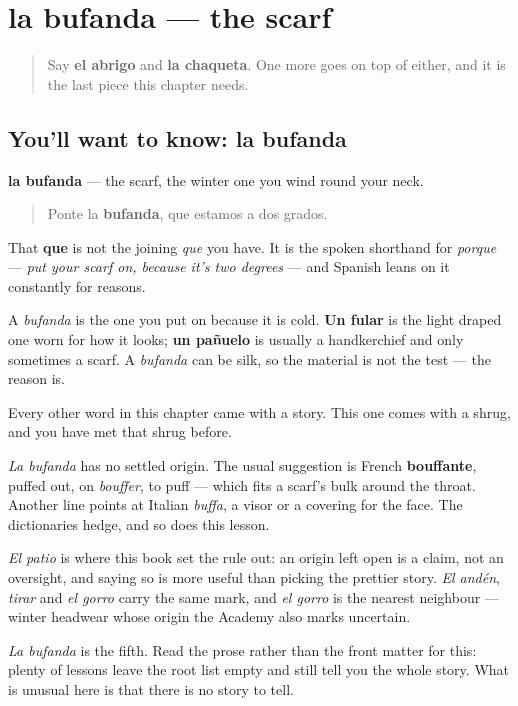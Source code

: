 \section[la bufanda]{la bufanda — the scarf}

\label{lesson:ES-C468-bufanda}



\begin{quote}
Say \textbf{el abrigo} and \textbf{la chaqueta}. One more goes on top of either, and it is the last piece this chapter needs.
\end{quote}

\subsection*{You'll want to know: la bufanda}
\textbf{la bufanda} — the scarf, the winter one you wind round your neck.

\begin{quote}
Ponte la \textbf{bufanda}, que estamos a dos grados.
\end{quote}

That \textbf{que} is not the joining \emph{que} you have. It is the spoken shorthand for \emph{porque} — \emph{put your scarf on, because it's two degrees} — and Spanish leans on it constantly for reasons.

A \emph{bufanda} is the one you put on because it is cold. \textbf{Un fular} is the light draped one worn for how it looks; \textbf{un pañuelo} is usually a handkerchief and only sometimes a scarf. A \emph{bufanda} can be silk, so the material is not the test — the reason is.

\begin{cousinweb}
Every other word in this chapter came with a story. This one comes with a shrug, and you have met that shrug before.

\emph{La bufanda} has no settled origin. The usual suggestion is French \textbf{bouffante}, puffed out, on \emph{bouffer}, to puff — which fits a scarf's bulk around the throat. Another line points at Italian \emph{buffa}, a visor or a covering for the face. The dictionaries hedge, and so does this lesson.

\emph{El patio} is where this book set the rule out: an origin left open is a claim, not an oversight, and saying so is more useful than picking the prettier story. \emph{El andén}, \emph{tirar} and \emph{el gorro} carry the same mark, and \emph{el gorro} is the nearest neighbour — winter headwear whose origin the Academy also marks uncertain.

\emph{La bufanda} is the fifth. Read the prose rather than the front matter for this: plenty of lessons leave the root list empty and still tell you the whole story. What is unusual here is that there is no story to tell.
\end{cousinweb}


